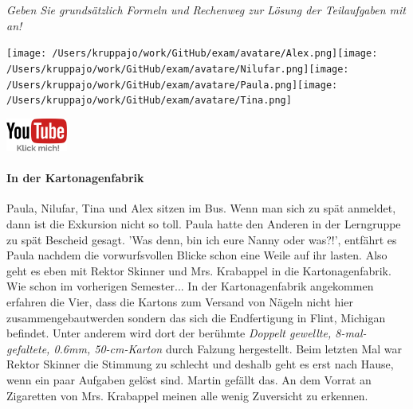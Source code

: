 \documentclass[a4paper, 9pt]{scrartcl}\usepackage[]{graphicx}\usepackage[]{xcolor}
\begin{document}
\textit{Geben Sie grundsätzlich Formeln und Rechenweg zur Lösung der Teilaufgaben mit an!} \\[1Ex]
 

 
\ifcollection
\begin{flushright}
\tiny\vspace{-3Ex}
\textbf{\examinhaltstart}
\exammodulemathstat
\vspace{-4Ex}
\end{flushright}
\begin{minipage}[t]{0.5\textwidth}
\texttt{[image: /Users/kruppajo/work/GitHub/exam/avatare/Alex.png]}\hspace{-4mm}\texttt{[image: /Users/kruppajo/work/GitHub/exam/avatare/Nilufar.png]}\hspace{-4mm}\texttt{[image: /Users/kruppajo/work/GitHub/exam/avatare/Paula.png]}\hspace{-4mm}\texttt{[image: /Users/kruppajo/work/GitHub/exam/avatare/Tina.png]}
\end{minipage}
\begin{minipage}[t]{0.5\textwidth}
\hfill
\href{https://youtu.be/RuzMjwvwT-4}{\includegraphics[width = 2cm]{img/youtube}}
\end{minipage}
\fi



\ifcollection
\paragraph{In der Kartonagenfabrik}
\fi



Paula, Nilufar, Tina und Alex sitzen im Bus. Wenn man sich zu spät anmeldet, dann ist die Exkursion nicht so toll. Paula hatte den Anderen in der Lerngruppe zu spät Bescheid gesagt. 'Was denn, bin ich eure Nanny oder was?!', entfährt es Paula nachdem die vorwurfsvollen Blicke schon eine Weile auf ihr lasten. Also geht es eben mit Rektor Skinner und Mrs. Krabappel in die Kartonagenfabrik. Wie schon im vorherigen Semester... In der Kartonagenfabrik angekommen erfahren die Vier, dass die Kartons zum Versand von Nägeln nicht hier zusammengebautwerden sondern das sich die Endfertigung in Flint, Michigan befindet. Unter anderem wird dort der berühmte \textit{Doppelt gewellte, 8-mal-gefaltete, 0.6mm, 50-cm-Karton} durch
Falzung hergestellt. Beim letzten Mal war Rektor Skinner die Stimmung zu schlecht und deshalb geht es erst nach Hause, wenn ein paar Aufgaben gelöst sind. Martin gefällt das. An dem Vorrat an Zigaretten von Mrs. Krabappel meinen alle wenig Zuversicht zu erkennen.\\
\end{document}

